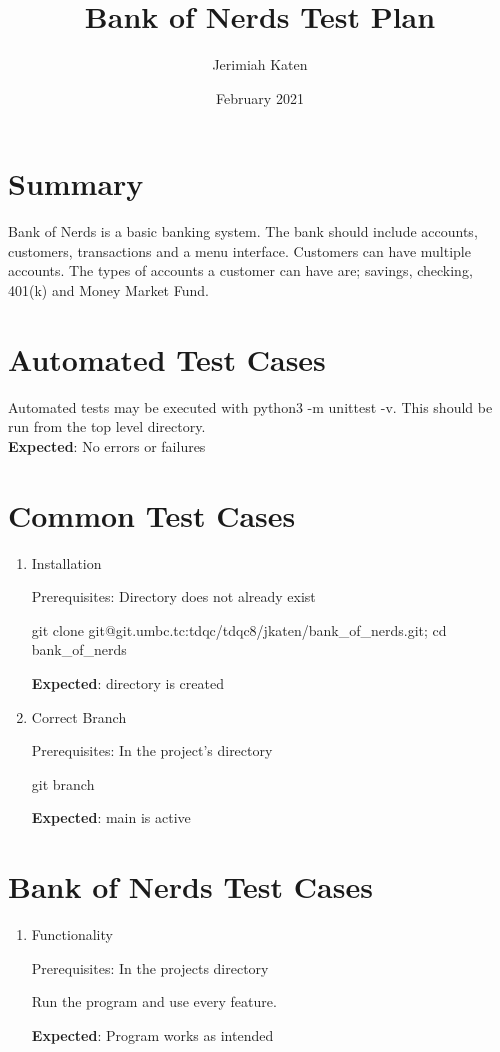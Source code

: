 \documentclass{article}
\title{Bank of Nerds Test Plan}
\author{Jerimiah Katen}
\date{February 2021}
\begin{document}
\maketitle

\section{Summary}

Bank of Nerds is a basic banking system. The bank should include accounts, customers, transactions and a menu interface. Customers can have multiple accounts. The types of accounts a customer can have are; savings, checking, 401(k) and Money Market Fund.

\section{Automated Test Cases}

Automated tests may be executed with {\footnotesize python3 -m unittest -v}. This should be run from the top level directory.
\\[.5cm]
\textbf{Expected}: No errors or failures

\section{Common Test Cases}


\begin{enumerate}
    \item Installation
    
    Prerequisites: Directory does not already exist

    {\footnotesize git clone git@git.umbc.tc:tdqc/tdqc8/jkaten/bank\_of\_nerds.git; cd bank\_of\_nerds}
    
    \textbf{Expected}: directory is created

    \item Correct Branch
    
    Prerequisites: In the project's directory
    
    {\footnotesize git branch}
    
    \textbf{Expected}: {\footnotesize main} is active
    
   \end{enumerate}

\section{{\footnotesize Bank of Nerds} Test Cases}

\begin{enumerate}
    \item Functionality
    
    Prerequisites: In the projects directory
    
    {\footnotesize Run the program and use every feature.}
    
    \textbf{Expected}: Program works as intended
    
\end{enumerate}
\end{document}
